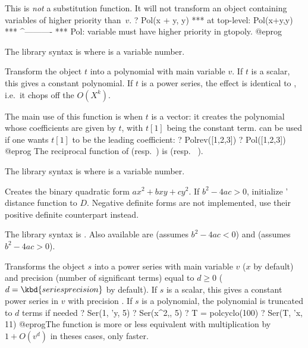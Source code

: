  This is \emph{not} a substitution function. It will not
transform an object containing variables of higher priority than~$v$.
\bprog
? Pol(x + y, y)
  ***   at top-level: Pol(x+y,y)
  ***                 ^----------
  *** Pol: variable must have higher priority in gtopoly.
@eprog

The library syntax is  where  is a variable number.

\label{se:Polrev}
Transform the object $t$ into a polynomial
with main variable $v$. If $t$ is a scalar, this gives a constant polynomial.
If $t$ is a power series, the effect is identical to , i.e.~it
chops off the $O(X^k)$.

The main use of this function is when $t$ is a vector: it creates the
polynomial whose coefficients are given by $t$, with $t[1]$ being the
constant term.  can be used if one wants $t[1]$ to be the leading
coefficient:
\bprog
? Polrev([1,2,3])
? Pol([1,2,3])
@eprog
The reciprocal function of  (resp.~) is  (resp.~
).

The library syntax is  where  is a variable number.

\label{se:Qfb}
Creates the binary quadratic form
$ax^2+bxy+cy^2$. If $b^2-4ac>0$, initialize ' distance
function to $D$. Negative definite forms are not implemented,
use their positive definite counterpart instead.

The library syntax is .
Also available are
 (assumes $b^2-4ac<0$) and
 (assumes $b^2-4ac>0$).

\label{se:Ser}
Transforms the object $s$ into a power series with main variable $v$
($x$ by default) and precision (number of significant terms) equal to
$d \geq 0$ ($d = \kbd{seriesprecision}$ by default). If $s$ is a
scalar, this gives a constant power series in $v$ with precision .
If $s$ is a polynomial, the polynomial is truncated to $d$ terms if needed
\bprog
? Ser(1, 'y, 5)
? Ser(x^2,, 5)
? T = polcyclo(100)
? Ser(T, 'x, 11)
@eprog\noindent The function is more or less equivalent with multiplication by
$1 + O(v^d)$ in theses cases, only faster.

